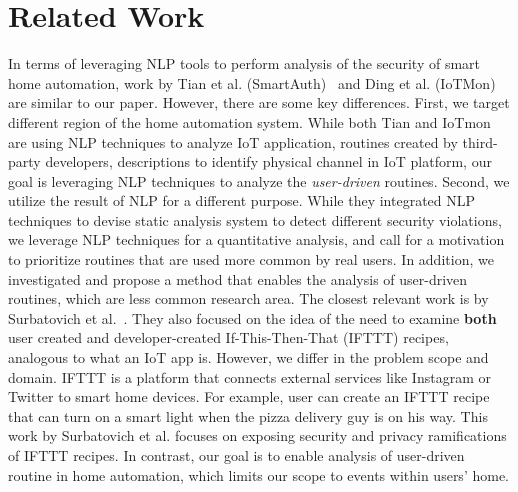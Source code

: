 \section{Related Work}
\label{sec:related-work}
In terms of leveraging NLP tools to perform analysis of the security of smart home automation, work by Tian et al. (SmartAuth)~\cite{tzl+17} and Ding et al. (IoTMon)~\cite{dh18} are similar to our paper. However, there are some key differences. First, we target different region of the home automation system. While both Tian and IoTmon are using NLP techniques to analyze IoT application, routines created by third-party developers, descriptions to identify physical channel in IoT platform, our goal is leveraging NLP techniques to analyze the \textit{user-driven} routines. Second, we utilize the result of NLP for a different purpose. While they integrated NLP techniques to devise static analysis system to detect different security violations, we leverage NLP techniques for a quantitative analysis, and call for a motivation to prioritize routines that are used more common by real users. In addition, we investigated and propose a method that enables the analysis of user-driven routines, which are less common research area.
The closest relevant work is by Surbatovich et al.~\cite{sab+17}. They also focused on the idea of the need to examine \textbf{both} user created and developer-created If-This-Then-That (IFTTT) recipes, analogous to what an IoT app is. However, we differ in the problem scope and domain. IFTTT is a platform that connects external services like Instagram or Twitter to smart home devices. For example, user can create an IFTTT recipe that can turn on a smart light when the pizza delivery guy is on his way. This work by Surbatovich et al. focuses on exposing security and privacy ramifications of IFTTT recipes. In contrast, our goal is to enable analysis of user-driven routine in home automation, which limits our scope to events within users' home.



